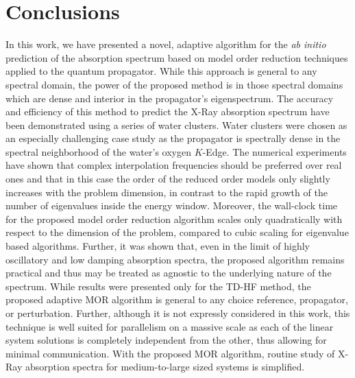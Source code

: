 \section{Conclusions}
\label{sec:MORconclusion}
In this work, we have presented a novel, adaptive algorithm for the \emph{ab
initio} prediction of the absorption spectrum based on model order reduction
techniques applied to the quantum propagator. While this approach is general to
any spectral domain, the power of the proposed method is in those spectral
domains which are dense and interior in the propagator's eigenspectrum. The
accuracy and efficiency of this method to predict the X-Ray absorption spectrum
have been demonstrated using a series of water clusters. Water clusters were
chosen as an especially challenging case study as the propagator is spectrally
dense in the spectral neighborhood of the water's oxygen $K$-Edge. The
numerical experiments have shown that complex interpolation frequencies should
be preferred over real ones and that in this case the order of the reduced
order models only slightly increases with the problem dimension, in contrast to
the rapid growth of the number of eigenvalues inside the energy window.
Moreover, the wall-clock time for the proposed model order reduction algorithm scales
only quadratically with respect to the dimension of the problem,
compared to cubic scaling for eigenvalue based algorithms.
Further, it was shown that, even in the limit of highly oscillatory and low
damping absorption spectra, the proposed algorithm remains practical and thus
may be treated as agnostic to the underlying nature of the spectrum.
While results were presented only
for the TD-HF method, the proposed adaptive MOR algorithm is general to any
choice reference, propagator, or perturbation. Further, although it is not
expressly considered in this work, this technique is well suited for
parallelism on a massive scale as each of the linear system solutions is
completely independent from the other, thus allowing for minimal communication.
With the proposed MOR algorithm, routine study of X-Ray absorption spectra for
medium-to-large sized systems is simplified.
